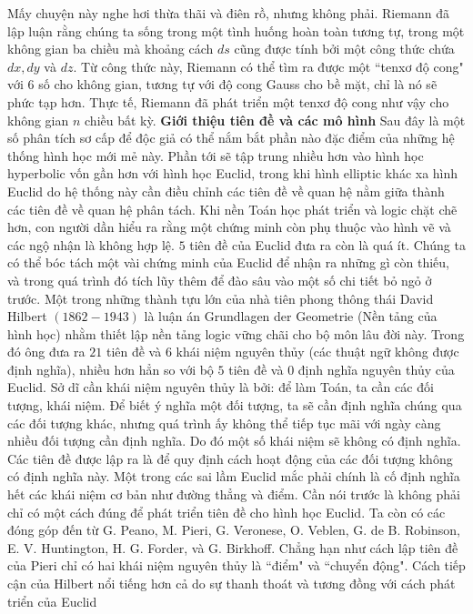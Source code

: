 \begin{multicols}{2}
	\vskip 0.1cm
	Mấy chuyện này nghe hơi thừa thãi và điên rồ, nhưng không phải. Riemann đã lập luận rằng chúng ta sống trong một tình huống hoàn toàn tương tự, trong một không gian ba chiều mà khoảng cách $ds$ cũng được tính bởi một công thức chứa $dx, dy$ và $dz$. Từ công thức này, Riemann có thể tìm ra được một ``tenxơ độ cong" với $6$ số cho không gian, tương tự với độ cong Gauss cho bề mặt, chỉ là nó sẽ phức tạp hơn. Thực tế, Riemann đã phát triển một tenxơ độ cong như vậy cho không gian $n$ chiều bất kỳ.
	\vskip 0.1cm
	\textbf{\color{lichsutoanhoc}Giới thiệu tiên đề và các mô hình}
	\vskip 0.1cm
	Sau đây là một số phân tích sơ cấp để độc giả có thể nắm bắt phần nào đặc điểm của những hệ thống hình học mới mẻ này. Phần tới sẽ tập trung nhiều hơn vào hình học hyperbolic vốn gần hơn với hình học Euclid, trong khi hình elliptic khác xa hình Euclid do hệ thống này cần điều chỉnh các tiên đề về quan hệ nằm giữa thành các tiên đề về quan hệ phân tách.  
	\vskip 0.1cm
	Khi nền Toán học phát triển và logic chặt chẽ hơn, con người dần hiểu ra rằng một chứng minh còn phụ thuộc vào hình vẽ và các ngộ nhận là không hợp lệ. $5$ tiên đề của Euclid đưa ra còn là quá ít. Chúng ta có thể bóc tách một vài chứng minh của Euclid để nhận ra những gì còn thiếu, và trong quá trình đó tích lũy thêm để đào sâu vào một số chi tiết bỏ ngỏ ở trước. 
	\vskip 0.1cm
	Một trong những thành tựu lớn của nhà tiên phong thông thái David Hilbert $(1862-1943)$ là luận án Grundlagen der Geometrie (Nền tảng của hình học) nhằm thiết lập nền tảng logic vững chãi cho bộ môn lâu đời này. Trong đó ông đưa ra $21$ tiên đề và $6$ khái niệm nguyên thủy (các thuật ngữ không được định nghĩa), nhiều hơn hẳn so với bộ $5$ tiên đề và $0$ định nghĩa nguyên thủy của Euclid.
	\vskip 0.1cm
	Sở dĩ cần khái niệm nguyên thủy là bởi: để làm Toán, ta cần các đối tượng, khái niệm. Để biết ý nghĩa một đối tượng, ta sẽ cần định nghĩa chúng qua các đối tượng khác, nhưng quá trình ấy không thể tiếp tục mãi với ngày càng nhiều đối tượng cần định nghĩa. Do đó một số khái niệm sẽ không có định nghĩa. Các tiên đề được lập ra là để quy định cách hoạt động của các đối tượng không có định nghĩa này. Một trong các sai lầm Euclid mắc phải chính là cố định nghĩa hết các khái niệm cơ bản như đường thẳng và điểm.
	\vskip 0.1cm
	Cần nói trước là không phải chỉ có một cách đúng để phát triển tiên đề cho hình học Euclid. Ta còn có các đóng góp đến từ G. Peano, M. Pieri, G. Veronese, O. Veblen, G. de B. Robinson, E. V. Huntington, H. G. Forder, và G. Birkhoff. Chẳng hạn như cách lập tiên đề của Pieri chỉ có hai khái niệm nguyên thủy là ``điểm" và ``chuyển động". Cách tiếp cận của Hilbert nổi tiếng hơn cả do sự thanh thoát và tương đồng với cách phát triển của Euclid

\end{multicols}
